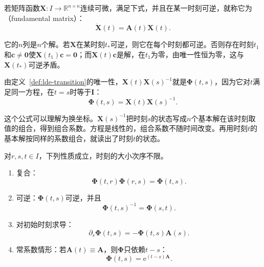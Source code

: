 \begin{definition}[基本解矩阵]
\label{def:lde-fundamental-matrix}
若矩阵函数$\bm{X}:I\to\mathbb{R}^{n\times n}$连续可微，满足下式，并且在某一时刻可逆，就称它为（fundamental matrix）：
\begin{equation}
 \dot{\bm{X}}(t)=\bm{A}(t)\bm{X}(t).
 \label{eq:lde-fundamental-matrix}
\end{equation}
\end{definition}

它的$n$列是$n$个解。若$\bm{X}$在某时刻$t_*$可逆，则它在每个时刻都可逆。否则存在时刻$t_1$和$\bm{c}\neq\bm{0}$使$\bm{X}(t_1)\bm{c}=\bm{0}$；而$\bm{X}(t)\bm{c}$是解，在$t_1$为零，由唯一性恒为零，这与$\bm{X}(t_*)$可逆矛盾。

由定义~\ref{def:lde-transition}的唯一性，$\bm{X}(t)\bm{X}(s)^{-1}$就是$\bm{\Phi}(t,s)$，因为它对$t$满足同一方程，在$t=s$时等于$\bm{I}$：
\begin{equation}
 \bm{\Phi}(t,s)=\bm{X}(t)\bm{X}(s)^{-1}.
 \label{eq:lde-fundamental-to-transition}
\end{equation}

这个公式可以理解为换坐标。$\bm{X}(s)^{-1}$把时刻$s$的状态写成$n$个基本解在该时刻取值的组合，得到组合系数。方程是线性的，组合系数不随时间改变。再用时刻$t$的基本解按同样的系数组合，就读出了时刻$t$的状态。

\begin{theorem}[状态转移矩阵的性质]
\label{thm:lde-transition-properties}
对$r,s,t\in I$，下列性质成立，时刻的大小次序不限。
\begin{enumerate}
 \item 复合：
 \begin{equation}
  \bm{\Phi}(t,r)\bm{\Phi}(r,s)=\bm{\Phi}(t,s).
  \label{eq:lde-transition-composition}
 \end{equation}
 \item 可逆：$\bm{\Phi}(t,s)$可逆，并且
 \begin{equation}
  \bm{\Phi}(t,s)^{-1}=\bm{\Phi}(s,t).
  \label{eq:lde-transition-inverse}
 \end{equation}
 \item 对初始时刻求导：
 \begin{equation}
  \partial_s\bm{\Phi}(t,s)=-\bm{\Phi}(t,s)\bm{A}(s).
  \label{eq:lde-transition-initial-derivative}
 \end{equation}
 \item 常系数情形：若$\bm{A}(t)\equiv\bm{A}$，则$\bm{\Phi}$只依赖$t-s$：
 \begin{equation}
  \bm{\Phi}(t,s)=\mathrm{e}^{(t-s)\bm{A}}.
  \label{eq:lde-transition-constant}
 \end{equation}
\end{enumerate}
\end{theorem}

